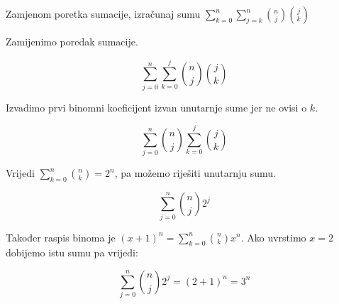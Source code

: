 \documentclass[exam.tex]{subfiles}
\begin{document}
	\begin{task}
		Zamjenom poretka sumacije, izračunaj sumu \( \displaystyle \sum\limits^n_{k=0} \sum\limits^n_{j=k} \binom{n}{j} \binom{j}{k} \) \\[1em]
	\end{task}
	
	Zamijenimo poredak sumacije.
	
	\[ \sum\limits^n_{j=0} \sum\limits^j_{k=0} \binom{n}{j} \binom{j}{k} \]
	
	Izvadimo prvi binomni koeficijent izvan unutarnje sume jer ne ovisi o \( k \).
	
	\[ \sum\limits^n_{j=0} \binom{n}{j} \sum\limits^j_{k=0} \binom{j}{k} \]
	
	Vrijedi \( \displaystyle \sum\limits^n_{k=0} \binom{n}{k} = 2^n \), pa možemo riješiti unutarnju sumu.
	
	\[ \sum\limits^n_{j=0} \binom{n}{j} 2^j \]
	
	Također raspis binoma je \( \displaystyle (x + 1)^n = \sum\limits^n_{k=0} \binom{n}{k} x^n \). Ako uvrstimo \( x = 2 \) dobijemo istu sumu pa vrijedi:
	
	\[ \sum\limits^n_{j=0} \binom{n}{j} 2^j = (2 + 1)^n = 3^n \]
\end{document}
